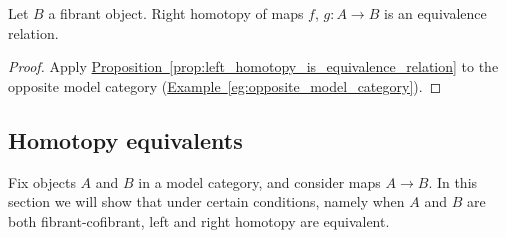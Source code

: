 \documentclass[main.tex]{subfiles}
\begin{document}
\begin{proposition}
  \label{prop:right_homotopy_is_equivalence_relation}
  Let $B$ a fibrant object. Right homotopy of maps $f$, $g\colon A \to B$ is an equivalence relation.
\end{proposition}
\begin{proof}
  Apply \hyperref[prop:left_homotopy_is_equivalence_relation]{Proposition~\ref*{prop:left_homotopy_is_equivalence_relation}} to the opposite model category (\hyperref[eg:opposite_model_category]{Example~\ref*{eg:opposite_model_category}}).
\end{proof}

\subsection{Homotopy equivalents}
\label{ssc:homotopy_equivalents}

Fix objects $A$ and $B$ in a model category, and consider maps $A \to B$. In this section we will show that under certain conditions, namely when $A$ and $B$ are both fibrant-cofibrant, left and right homotopy are equivalent.
\end{document}
